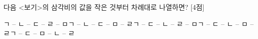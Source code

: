 다음 <보기>의 삼각비의 값을 작은 것부터 차례대로 나열하면? \mbox{[4점]} 
\begin{choicesv}{ㄱ -- ㄴ -- ㄷ -- ㄹ -- ㅁ}{ㄱ -- ㄴ -- ㄷ -- ㅁ -- ㄹ}{ㄱ -- ㄷ -- ㄴ -- ㄹ -- ㅁ}{ㄱ -- ㄷ -- ㄴ -- ㅁ -- ㄹ}{ㄱ -- ㄷ -- ㅁ -- ㄴ -- ㄹ}\end{choicesv}
